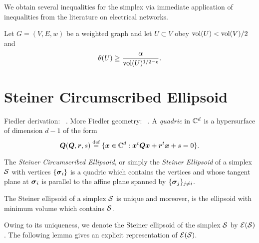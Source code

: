 We obtain several inequalities for the simplex via immediate application of inequalities from the literature on electrical networks. 

\begin{lemma}
Let $G=(V,E,w)$ be a weighted graph and let $U\subset V$ obey $\textnormal{vol}(U)<\textnormal{vol}(V)/2$ and \[\theta(U) \geq \frac{\alpha}{\textnormal{vol}(U)^{1/2-\epsilon}}.\]
\end{lemma}

\section{Steiner Circumscribed Ellipsoid}
Fiedler derivation: ~\cite{fiedler2005geometry}. More Fiedler geometry: ~\cite{fiedler1993geometric}. 
A \emph{quadric} in $\mathbb{C}^d$ is a hypersurface of dimension $d-1$ of the form 
\begin{equation*}
    \vb*{{Q}}(\vb*{Q},\vb*{r},s) \overset{\text{def}}{=} \{\vb*{x}\in\mathbb{C}^d: \vb*{x}^t \vb*{Q}\vb*{x} + \vb*{r}^t \vb*{x} + s=0\}.
\end{equation*}

\begin{definition}
\label{def:steiner_ellipsoid}
The \emph{Steiner Circumscribed Ellipsoid}, or simply the \emph{Steiner Ellipsoid} of a simplex $\mathcal{S}$ with vertices $\{\vb*{\sigma}_i\}$ is a quadric which contains the vertices and whose tangent plane at $\vb*{\sigma}_i$ is parallel to the affine plane spanned by $\{\vb*{\sigma}_j\}_{j\neq i}$. 
\end{definition}

\begin{theorem}
The Steiner ellipsoid of a simplex $\mathcal{S}$ is unique and moreover, is the ellipsoid with minimum volume which contains $\mathcal{S}$. 
\end{theorem}

Owing to its uniqueness, we denote the Steiner ellipsoid of the simplex $\mathcal{S}$ by $\mathcal{E}(\mathcal{S})$. The following lemma gives an explicit representation of $\mathcal{E}(\mathcal{S})$. 

